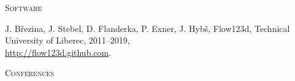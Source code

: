 \documentclass[bibliography=totocnumbered,dvipsnames,FM,Dis, EN]{tulthesis_autoreferat}
\begin{document}
\begin{itemize}[label={}, leftmargin=*]
% 
% 
% 
\end{itemize}
%
\vspace{0.5cm}
%
{\noindent\large\textsc{Software}}
\begin{itemize}[label={}, leftmargin=*]
{\small
\item
J. B{\v r}ezina, J. Stebel, D. Flanderka, P. Exner, J. Hyb{\v s}, Flow123d, 
Technical University of Liberec, 2011--2019, \\
\href{http://flow123d.github.com}{http://flow123d.github.com}.
}
\end{itemize}
%
\vspace{0.5cm}
%
{\noindent\large\textsc{Conferences}}
%
\end{document}
